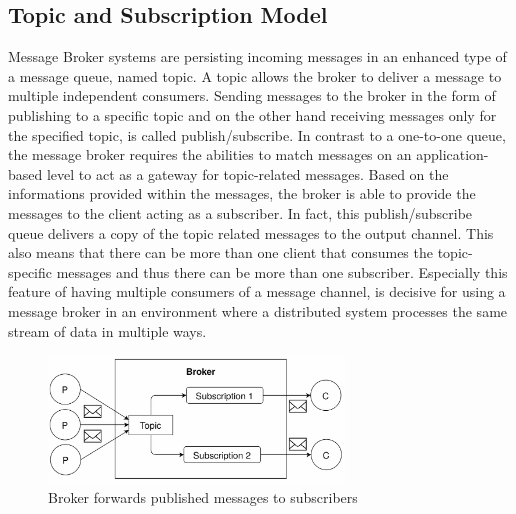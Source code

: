 

\subsection{Topic and Subscription Model}
\label{intro-messaging-publishsubscribe}
Message Broker systems are persisting incoming messages in an enhanced type of a
message queue, named topic. A topic allows the broker to deliver a message to
multiple independent consumers. Sending messages to the broker in the form of
publishing to a specific topic and on the other hand receiving messages only for
the specified topic, is called publish/subscribe. In contrast to a one-to-one
queue, the message broker requires the abilities to match messages on an
application-based level to act as a gateway for topic-related messages. Based on
the informations provided within the messages, the broker is able to
provide the messages to the client acting as a subscriber. In fact,
this publish/subscribe queue delivers a copy of the topic related messages to
the output channel. This also means that there can be more than one client that
consumes the topic-specific
messages and thus there can be more than one subscriber. Especially this feature
of having multiple consumers of a message channel, is decisive for using a
message broker in an environment where a distributed system processes the same stream of
data in multiple ways. 
\cite{EIP03} \cite{TAN06}

\begin{figure}[H]
    \centering
    \includegraphics[width=0.7\textwidth]{images/topic-subscription.png}
    \caption{Broker forwards published messages to subscribers}
    \label{fig:topic-subscription}
\end{figure}

